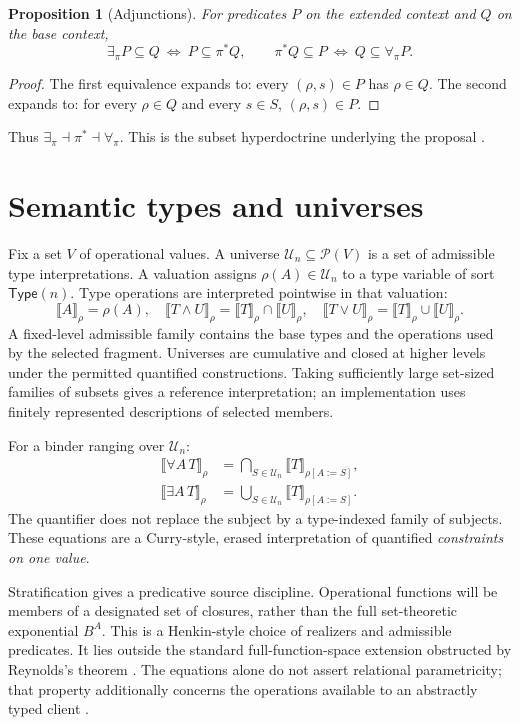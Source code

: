 \documentclass[11pt,a4paper,oneside]{report}
\newcommand{\sem}[1]{\llbracket #1\rrbracket}
\newcommand{\Pow}{\mathcal P}
\newcommand{\Type}{\mathsf{Type}}
\newcommand{\U}{\mathcal U}
\newtheorem{proposition}[definition]{Proposition}
\theoremstyle{remark}
\begin{document}
\begin{proposition}[Adjunctions]\label{prop:adjoints}
For predicates $P$ on the extended context and $Q$ on the base context,
\[
 \exists_\pi P\subseteq Q\ \Longleftrightarrow\ P\subseteq\pi^*Q,
 \qquad
 \pi^*Q\subseteq P\ \Longleftrightarrow\ Q\subseteq\forall_\pi P.
\]
\end{proposition}
\begin{proof}
The first equivalence expands to: every $(\rho,s)\in P$ has $\rho\in Q$.
The second expands to: for every $\rho\in Q$ and every $s\in S$,
$(\rho,s)\in P$.
\end{proof}
Thus $\exists_\pi\dashv\pi^*\dashv\forall_\pi$. This is the subset
hyperdoctrine underlying the proposal \cite{lawvere,mellies}.

\section{Semantic types and universes}
Fix a set $V$ of operational values. A universe $\U_n\subseteq\Pow(V)$ is a
set of admissible type interpretations. A valuation assigns
$\rho(A)\in\U_n$ to a type variable of sort $\Type(n)$.
Type operations are interpreted pointwise in that valuation:
\[
 \sem{A}_\rho=\rho(A),\quad
 \sem{T\land U}_\rho=\sem T_\rho\cap\sem U_\rho,\quad
 \sem{T\lor U}_\rho=\sem T_\rho\cup\sem U_\rho.
\]
A fixed-level admissible family contains the base types and the operations used
by the selected fragment. Universes are cumulative and closed at higher levels
under the permitted quantified constructions. Taking sufficiently large
set-sized families of subsets gives a reference interpretation; an implementation
uses finitely represented descriptions of selected members.

For a binder ranging over $\U_n$:
\begin{align}
 \sem{\forall A\,T}_\rho
 &=\bigcap_{S\in\U_n}\sem T_{\rho[A:=S]},\label{eq:foralltype}\\
 \sem{\exists A\,T}_\rho
 &=\bigcup_{S\in\U_n}\sem T_{\rho[A:=S]}.\label{eq:existstype}
\end{align}
The quantifier does not replace the subject by a type-indexed family of subjects.
These equations are a Curry-style, erased interpretation of quantified
\emph{constraints on one value}.

Stratification gives a predicative source discipline. Operational functions will
be members of a designated set of closures, rather than the full set-theoretic
exponential $B^A$. This is a Henkin-style choice of realizers and admissible
predicates. It lies outside the standard full-function-space extension obstructed
by Reynolds's theorem \cite{reynolds84}. The equations alone do not assert
relational parametricity; that property additionally concerns the operations
available to an abstractly typed client \cite{reynolds83}.
\end{document}
